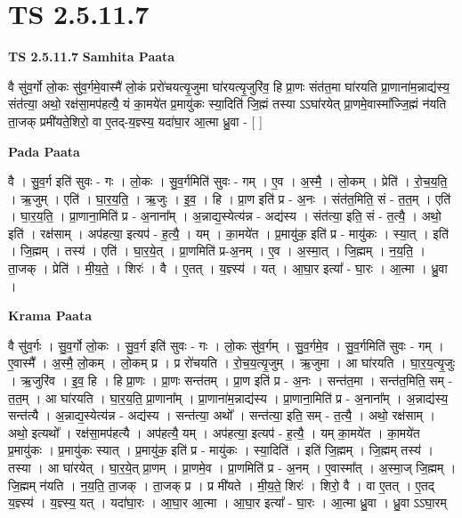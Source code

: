\documentclass[17pt]{extarticle}
\begin{document}
\section*{ TS 2.5.11.7 }

\textbf{TS 2.5.11.7 } \newline
\textbf{Samhita Paata} \newline

वै सु॑व॒र्गो लो॒कः सु॑व॒र्गमे॒वास्मै॑ लो॒कं प्ररो॑चयत्यृ॒जुमा घा॑रयत्यृ॒जुरि॑व॒ हि प्रा॒णः संत॑त॒मा घा॑रयति प्रा॒णाना॑म॒न्नाद्य॑स्य॒ संत॑त्या॒ अथो॒ रक्ष॑सा॒मप॑हत्यै॒ यं का॒मये॑त प्र॒मायु॑कः स्या॒दिति॑ जि॒ह्मं तस्या ऽऽघा॑रयेत् प्रा॒णमे॒वास्मा᳚ज्जि॒ह्मं न॑यति ता॒जक् प्रमी॑यते॒शिरो॒ वा ए॒तद्-य॒ज्ञ्स्य॒ यदा॑घा॒र आ॒त्मा ध्रु॒वा - [  ] \newline

\textbf{Pada Paata} \newline

वै । सु॒व॒र्ग इति॑ सुवः - गः । लो॒कः । सु॒व॒र्गमिति॑ सुवः - गम् । ए॒व । अ॒स्मै॒ । लो॒कम् । प्रेति॑ । रो॒च॒य॒ति॒ । ऋ॒जुम् । एति॑ । घा॒र॒य॒ति॒ । ऋ॒जुः । इ॒व॒ । हि । प्रा॒ण इति॑ प्र - अ॒नः । संत॑त॒मिति॒ सं - त॒त॒म् । एति॑ । घा॒र॒य॒ति॒ । प्रा॒णाना॒मिति॑ प्र - अ॒नाना᳚म् । अ॒न्नाद्य॒स्येत्य॑न्न - अद्य॑स्य । संत॑त्या॒ इति॒ सं - त॒त्यै॒ । अथो॒ इति॑ । रक्ष॑साम् । अप॑हत्या॒ इत्यप॑ - ह॒त्यै॒ । यम् । का॒मये॑त । प्र॒मायु॑क॒ इति॑ प्र - मायु॑कः । स्या॒त् । इति॑ । जि॒ह्मम् । तस्य॑ । एति॑ । घा॒र॒ये॒त् । प्रा॒णमिति॑ प्र-अ॒नम् । ए॒व । अ॒स्मा॒त् । जि॒ह्मम् । न॒य॒ति॒ । ता॒जक् । प्रेति॑ । मी॒य॒ते॒ । शिरः॑ । वै । ए॒तत् । य॒ज्ञ्स्य॑ । यत् । आ॒घा॒र इत्या᳚ - घा॒रः । आ॒त्मा । ध्रु॒वा ।  \newline


\textbf{Krama Paata} \newline

वै सु॑व॒र्गः । सु॒व॒र्गो लो॒कः । सु॒व॒र्ग इति॑ सुवः - गः । लो॒कः सु॑व॒र्गम् । सु॒व॒र्गमे॒व । सु॒व॒र्गमिति॑ सुवः - गम् । ए॒वास्मै᳚ । अ॒स्मै॒ लो॒कम् । लो॒कम् प्र । प्र रो॑चयति । रो॒च॒य॒त्यृ॒जुम् । ऋ॒जुमा । आ घा॑रयति । घा॒र॒य॒त्यृ॒जुः । ऋ॒जुरि॑व । इ॒व॒ हि । हि प्रा॒णः । प्रा॒णः सन्त॑तम् । प्रा॒ण इति॑ प्र - अ॒नः । सन्त॑त॒मा । सन्त॑त॒मिति॒ सम् - त॒त॒म् । आ घा॑रयति । घा॒र॒य॒ति॒ प्रा॒णाना᳚म् । प्रा॒णाना॑म॒न्नाद्य॑स्य । प्रा॒णाना॒मिति॑ प्र - अ॒नाना᳚म् । अ॒न्नाद्य॑स्य॒ सन्त॑त्यै । अ॒न्नाद्य॒स्येत्य॑न्न - अद्य॑स्य । सन्त॑त्या॒ अथो᳚ । सन्त॑त्या॒ इति॒ सम् - त॒त्यै॒ । अथो॒ रक्ष॑साम् । अथो॒ इत्यथो᳚ । रक्ष॑सा॒मप॑हत्यै । अप॑हत्यै॒ यम् । अप॑हत्या॒ इत्यप॑ - ह॒त्यै॒ । यम् का॒मये॑त । का॒मये॑त प्र॒मायु॑कः । प्र॒मायु॑कः स्यात् । प्र॒मायु॑क॒ इति॑ प्र - मायु॑कः । स्या॒दिति॑ । इति॑ जि॒ह्मम् । जि॒ह्मम् तस्य॑ । तस्या । आ घा॑रयेत् । घा॒र॒ये॒त् प्रा॒णम् । प्रा॒णमे॒व । प्रा॒णमिति॑ प्र - अ॒नम् । ए॒वास्मा᳚त् । अ॒स्मा॒ज् जि॒ह्मम् । जि॒ह्मम् न॑यति । न॒य॒ति॒ ता॒जक् । ता॒जक् प्र । प्र मी॑यते । मी॒य॒ते॒ शिरः॑ । शिरो॒ वै । वा ए॒तत् । ए॒तद् य॒ज्ञ्स्य॑ । य॒ज्ञ्स्य॒ यत् । यदा॑घा॒रः । आ॒घा॒र आ॒त्मा । आ॒घा॒र इत्या᳚ - घा॒रः । आ॒त्मा ध्रु॒वा । ध्रु॒वा ऽऽघा॒रम् \newline
\end{document}
